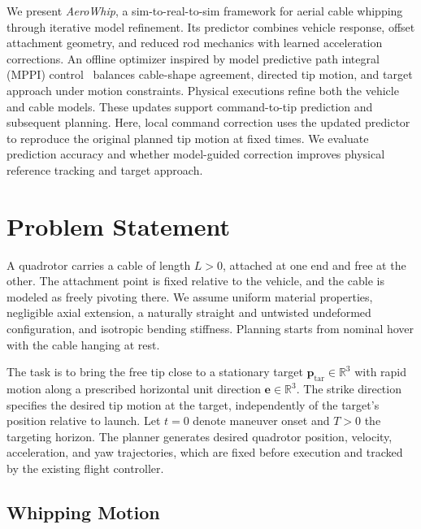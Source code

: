 \documentclass[letterpaper, 10 pt, conference]{ieeeconf}
\begin{document}
We present \emph{AeroWhip}, a sim-to-real-to-sim framework for
aerial cable whipping through iterative model refinement. Its predictor combines vehicle
response, offset attachment geometry, and reduced rod mechanics
with learned acceleration corrections. An offline optimizer
inspired by model predictive path integral (MPPI)
control~\cite{williams2017model} balances cable-shape agreement,
directed tip motion, and target approach under motion constraints.
Physical executions refine both the vehicle and cable models.
These updates support command-to-tip prediction and subsequent
planning. Here, local command correction uses the updated predictor
to reproduce the original planned tip motion at fixed times.
We evaluate prediction accuracy and whether model-guided correction
improves physical reference tracking and target approach.

\section{Problem Statement}
\label{sec:problem_statement}

A quadrotor carries a cable of length $L>0$, attached at one end
and free at the other. The attachment point is fixed relative
to the vehicle, and the cable is modeled as freely pivoting there.
We assume uniform material properties, negligible axial extension,
a naturally straight and untwisted undeformed configuration,
and isotropic bending stiffness.
Planning starts from nominal hover with the cable hanging at rest.

The task is to bring the free tip close to a stationary target
$\mathbf p_{\mathrm{tar}}\in\mathbb R^3$ with rapid motion along
a prescribed horizontal unit direction $\mathbf e\in\mathbb R^3$.
The strike direction specifies the desired tip motion at the
target, independently of the target's position relative to launch.
Let $t=0$ denote maneuver onset and $T>0$ the targeting horizon.
The planner generates desired quadrotor position, velocity,
acceleration, and yaw trajectories, which are fixed before
execution and tracked by the existing flight controller.

\subsection{Whipping Motion}
\label{subsec:whipping_motion}
\end{document}
